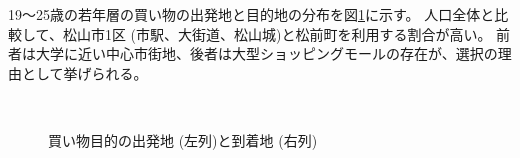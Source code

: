\documentclass[a4paper,12pt, uplatex]{jsbook}
\begin{document}
19〜25歳の若年層の買い物の出発地と目的地の分布を図\ref{fig:od_shopping_young}に示す。
人口全体と比較して、松山市1区 (市駅、大街道、松山城)と松前町を利用する割合が高い。
前者は大学に近い中心市街地、後者は大型ショッピングモールの存在が、選択の理由として挙げられる。
%
\begin{figure}[htbp]
  \centering
  \\%
    \caption{買い物目的の出発地 (左列)と到着地 (右列)}
  	\label{fig:od_shopping_young}
\end{figure}
\end{document}
